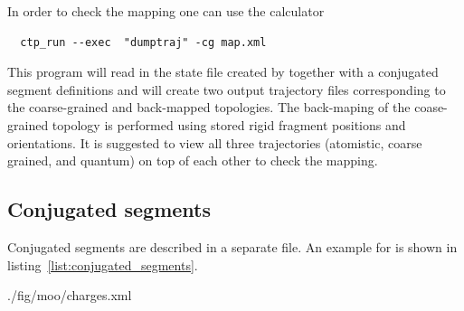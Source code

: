 In order to check the mapping one can use the \dumptraj calculator
\begin{verbatim}
  ctp_run --exec  "dumptraj" -cg map.xml 
\end{verbatim}

This program will read in the state file created by \ctpmap together with a conjugated segment definitions and will create two output trajectory files corresponding to the coarse-grained and back-mapped topologies. The back-maping of the coase-grained topology is performed using stored rigid fragment positions and orientations. It is suggested to view all three trajectories (atomistic, coarse grained, and quantum) on top of each other to check the mapping.

\subsection{Conjugated segments}

Conjugated segments are described in a separate \xml file. An example for \dcvt is shown in listing~\ref{list:conjugated_segments}.


%
{./fig/moo/charges.xml}

\noindent
{}

